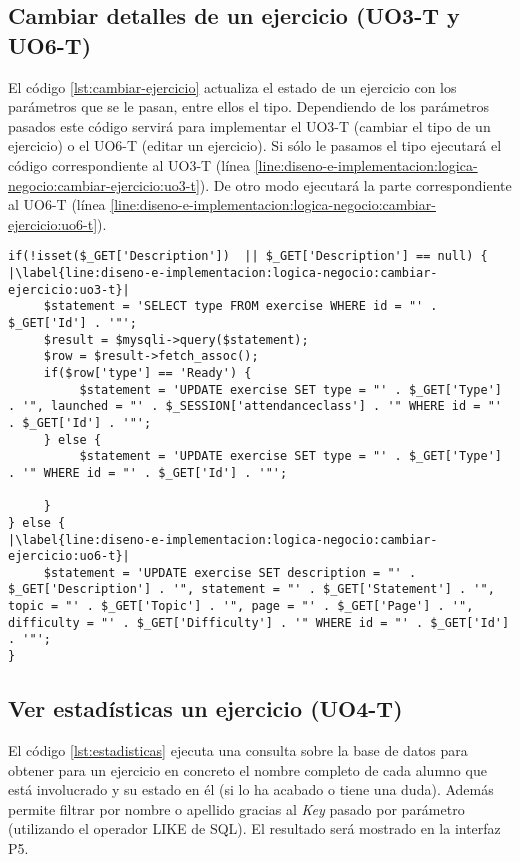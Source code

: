 \subsection{Cambiar detalles de un ejercicio (UO3-T y UO6-T)}
\label{diseno-e-implementacion:logica-negocio:cambiar-ejercicio}

El código \ref{lst:cambiar-ejercicio} actualiza el estado de un ejercicio con los parámetros que se le pasan, entre ellos el tipo. Dependiendo de los parámetros pasados este código servirá para implementar el UO3-T (cambiar el tipo de un ejercicio) o el UO6-T (editar un ejercicio). Si sólo le pasamos el tipo ejecutará el código correspondiente al UO3-T (línea \ref{line:diseno-e-implementacion:logica-negocio:cambiar-ejercicio:uo3-t}). De otro modo ejecutará la parte correspondiente al UO6-T (línea \ref{line:diseno-e-implementacion:logica-negocio:cambiar-ejercicio:uo6-t}).

\noindent
\begin{lstlisting}[caption=Cambiar el tipo de un ejercicio.,label={lst:cambiar-ejercicio}]
if(!isset($_GET['Description'])  || $_GET['Description'] == null) {
|\label{line:diseno-e-implementacion:logica-negocio:cambiar-ejercicio:uo3-t}|
     $statement = 'SELECT type FROM exercise WHERE id = "' . $_GET['Id'] . '"';
     $result = $mysqli->query($statement);
     $row = $result->fetch_assoc();
     if($row['type'] == 'Ready') {
          $statement = 'UPDATE exercise SET type = "' . $_GET['Type'] . '", launched = "' . $_SESSION['attendanceclass'] . '" WHERE id = "' . $_GET['Id'] . '"';
     } else {
          $statement = 'UPDATE exercise SET type = "' . $_GET['Type'] . '" WHERE id = "' . $_GET['Id'] . '"';

     }
} else {
|\label{line:diseno-e-implementacion:logica-negocio:cambiar-ejercicio:uo6-t}|
     $statement = 'UPDATE exercise SET description = "' . $_GET['Description'] . '", statement = "' . $_GET['Statement'] . '", topic = "' . $_GET['Topic'] . '", page = "' . $_GET['Page'] . '", difficulty = "' . $_GET['Difficulty'] . '" WHERE id = "' . $_GET['Id'] . '"';
}
\end{lstlisting}
 
\subsection{Ver estadísticas un ejercicio (UO4-T)}
\label{diseno-e-implementacion:logica-negocio:estadisticas} 

El código \ref{lst:estadisticas} ejecuta una consulta sobre la base de datos para obtener para un ejercicio en concreto el nombre completo de cada alumno que está involucrado y su estado en él (si lo ha acabado o tiene una duda). Además permite filtrar por nombre o apellido gracias al \textit{Key} pasado por parámetro (utilizando el operador LIKE de SQL). El resultado será mostrado en la interfaz P5.\\

